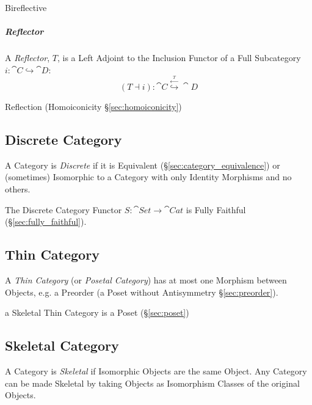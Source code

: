 Bireflective



\subparagraph{Reflector}\label{sec:reflector}\hfill


A \emph{Reflector}, $T$, is a Left Adjoint to the Inclusion Functor of
a Full Subcategory $i : \cat{C} \hookrightarrow \cat{D}$:
\[
  (T \dashv i) :
  \cat{C} \stackrel{\xleftarrow{T}}{\hookrightarrow} \cat{D}
\]

Reflection (Homoiconicity \S\ref{sec:homoiconicity})



\subsection{Discrete Category}\label{sec:discrete_category}

A Category is \emph{Discrete} if it is Equivalent
(\S\ref{sec:category_equivalence}) or (sometimes) Isomorphic to a
Category with only Identity Morphisms and no others.

The Discrete Category Functor $S : \cat{Set} \rightarrow
\cat{Cat}$ is Fully Faithful (\S\ref{sec:fully_faithful}).



\subsection{Thin Category}\label{sec:thin_category}

A \emph{Thin Category} (or \emph{Posetal Category}) has at most one Morphism
between Objects, e.g. a Preorder (a Poset without Antisymmetry
\S\ref{sec:preorder}).

a Skeletal Thin Category is a Poset (\S\ref{sec:poset})



\subsection{Skeletal Category}\label{sec:skeletal_category}

A Category is \emph{Skeletal} if Isomorphic Objects are the same
Object. Any Category can be made Skeletal by taking Objects as
Isomorphism Classes of the original Objects.

